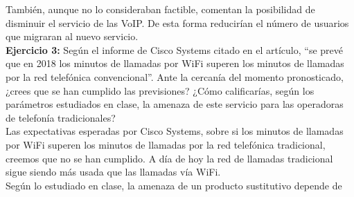 \documentclass[11pt]{article}
\theoremstyle{plain}
\theoremstyle{definition}
\begin{document}
También, aunque no lo consideraban factible, comentan la posibilidad
de disminuir el servicio de las VoIP. De esta forma reducirían el
número de usuarios que migraran al nuevo servicio.\\



\textbf{Ejercicio 3:} Según el informe de Cisco Systems citado en el
artículo, ``se prevé que en 2018 los minutos de llamadas por WiFi
superen los minutos de llamadas por la red telefónica
convencional''. Ante la cercanía del momento pronosticado, ¿crees que
se han cumplido las previsiones? ¿Cómo calificarías, según los
parámetros estudiados en clase, la amenaza de este servicio para las
operadoras de telefonía tradicionales?\\

Las expectativas esperadas por Cisco Systems, sobre si los minutos de
llamadas por WiFi superen los minutos de llamadas por la red telefónica
tradicional, creemos que no se han cumplido. A día de hoy la red de
llamadas tradicional sigue siendo más usada que las llamadas vía WiFi.\\

Según lo estudiado en clase, la amenaza de un producto sustitutivo
depende de

\printbibliography
\end{document}
